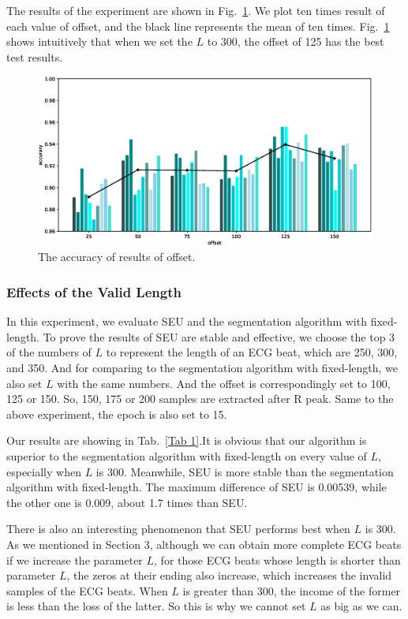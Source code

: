 \documentclass[wcp]{jmlr}
\begin{document}
The results of the experiment are shown in Fig.~\ref{Fig 7}. We plot ten times result of each value of offset, and the black line represents the mean of ten times. Fig.~\ref{Fig 7} shows intuitively that when we set the $L$ to 300, the offset of 125 has the best test results.
\noindent
\begin{figure}
\centering
\includegraphics[scale=0.5]{offset.eps}
\caption{The accuracy of  results of offset.}
\label{Fig 7}
\centering
\end{figure}
\subsubsection{Effects of the Valid Length}
In this experiment, we evaluate SEU and the segmentation algorithm with fixed-length. To prove the results of SEU are stable and effective, we choose the top 3 of the numbers of $L$ to represent the length of an ECG beat, which are 250, 300, and 350. And for comparing to the segmentation algorithm with fixed-length, we also set $L$ with the same numbers. And the offset is correspondingly set to 100, 125 or 150. So, 150, 175 or 200 samples are extracted after R peak. Same to the above experiment, the epoch is also set to 15.


Our results are showing in Tab.~\ref{Tab 1}.It is obvious that our algorithm is superior to the segmentation algorithm with fixed-length on every value of $L$, especially when $L$ is 300. Meanwhile, SEU is more stable than the segmentation algorithm with fixed-length. The maximum difference of SEU is 0.00539, while the other one is 0.009, about 1.7 times than SEU.


There is also an interesting phenomenon that SEU performs best when $L$ is 300. As we mentioned in Section 3, although we can obtain more complete ECG beats if we increase the parameter $L$, for those ECG beats whose length is shorter than parameter $L$, the zeros at their ending also increase, which increases the invalid samples of the ECG beats. When $L$ is greater than 300, the income of the former is less than the loss of the latter. So this is why we cannot set $L$ as big as we can.
\\
\end{document}
